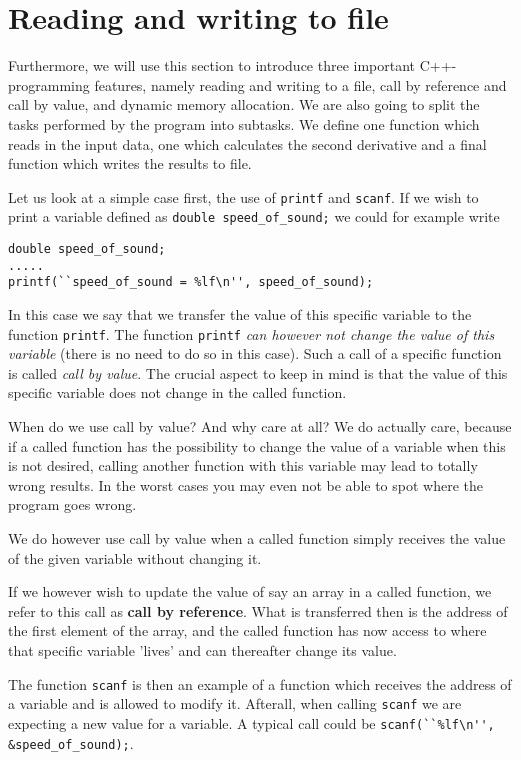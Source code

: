 \section{Reading and writing to file}



Furthermore, we will use this section to introduce three
important C++-programming features, namely reading and writing to
a file, call by reference and call by value, and dynamic memory allocation.
We are also going to split the tasks performed
by the program into subtasks. We define one function
which reads in the input data, one which calculates the second derivative
and a final function
which writes the results to file.


Let us look at a simple case first, the use of 
\verb?printf? and \verb?scanf?. If we wish to print
a  variable defined as  
\verb?double speed_of_sound;?
we could  for example write 
\begin{lstlisting}
double speed_of_sound;
.....
printf(``speed_of_sound = %lf\n'', speed_of_sound);
\end{lstlisting}

In this case we say that we transfer the value of this specific variable
to the function \verb?printf?. The function \verb?printf? 
{\em can however not change the value of this variable} 
(there is no need to do so in this case). 
Such a call
of a specific  function is called {\em call by value}. 
The crucial aspect to keep in mind is that the value of this
specific variable does not change in the called function.

When do we use call by value? And why care at all? 
We do actually care, because if a called function has the possibility
to change the value of a variable when this is not desired,
calling another function with this variable may lead to totally wrong
results. In the worst cases you may even not be able to spot where the
program goes wrong. 

We do however use call by value when a called function
simply receives the value of the given variable without changing it.

If we however wish to update the value of say an array 
in a called function, we refer to this call as {\bf call by reference}.
What is transferred then is the address of the first element of the array,
and the called function has now access to where that specific
variable 'lives' and can thereafter change its value. 

The function \verb?scanf? is then an example of a function which receives
the address of a variable and is allowed to modify it. Afterall, when calling
\verb?scanf? we are expecting a new value for a variable. 
A typical call could be
\verb?scanf(``%lf\n'', &speed_of_sound);?.

